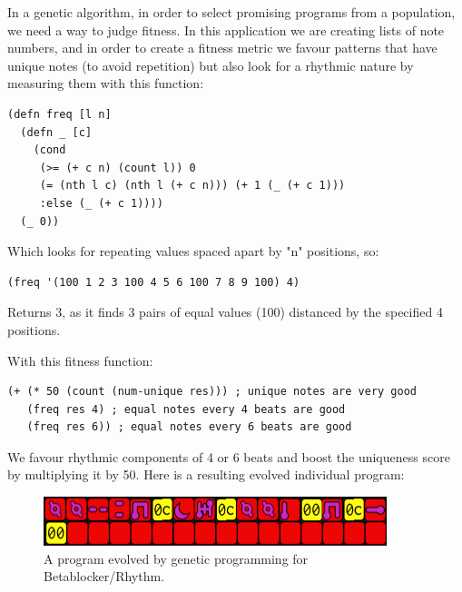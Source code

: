 \documentclass[letterpaper, 12pt]{article}
\begin{document}
In a genetic algorithm, in order to select promising programs from a population, we need a way to judge fitness. In this application we are creating lists of note numbers, and in order to create a fitness metric we favour patterns that have unique notes (to avoid repetition) but also look for a rhythmic nature by measuring them with this function:

\begin{Verbatim}[fontfamily=courier, xleftmargin=\parindent]
(defn freq [l n]
  (defn _ [c]
    (cond
     (>= (+ c n) (count l)) 0
     (= (nth l c) (nth l (+ c n))) (+ 1 (_ (+ c 1)))
     :else (_ (+ c 1))))
  (_ 0))
\end{Verbatim}

Which looks for repeating values spaced apart by "n" positions, so:

\begin{Verbatim}[fontfamily=courier, xleftmargin=\parindent]
(freq '(100 1 2 3 100 4 5 6 100 7 8 9 100) 4) 
\end{Verbatim}

Returns 3, as it finds 3 pairs of equal values (100) distanced by the specified 4 positions.

With this fitness function:

\begin{Verbatim}[fontfamily=courier, xleftmargin=\parindent]
(+ (* 50 (count (num-unique res))) ; unique notes are very good
   (freq res 4) ; equal notes every 4 beats are good
   (freq res 6)) ; equal notes every 6 beats are good
\end{Verbatim}

We favour rhythmic components of 4 or 6 beats and boost the uniqueness score by multiplying it by 50. Here is a resulting evolved individual program:

\begin{figure}[H]
	\centering
		\includegraphics[width=10cm]{evolved}
	\caption{A program evolved by genetic programming for Betablocker/Rhythm.}
	\label{fig:evolved}
\end{figure}
\end{document}
